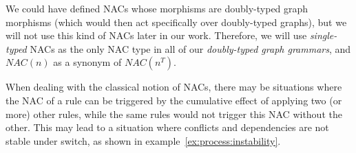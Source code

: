 \begin{remark}
We could have defined NACs whose morphisms are doubly-typed graph morphisms (which would then act specifically over doubly-typed graphs), but we will not use this kind of NACs later in our work. Therefore, we will use \emph{single-typed} NACs as the only NAC type in all of our \emph{doubly-typed graph grammars}, and $NAC(n)$ as a synonym of $NAC(n^T)$.

\end{remark}

When dealing with the classical notion of NACs, there may be situations where the NAC of a rule can be triggered by the cumulative effect of applying two (or more) other rules, while the same rules would not trigger this NAC without the other. This may lead to a situation where conflicts and dependencies are not stable under switch, as shown in example~\ref{ex:process:instability}. 

